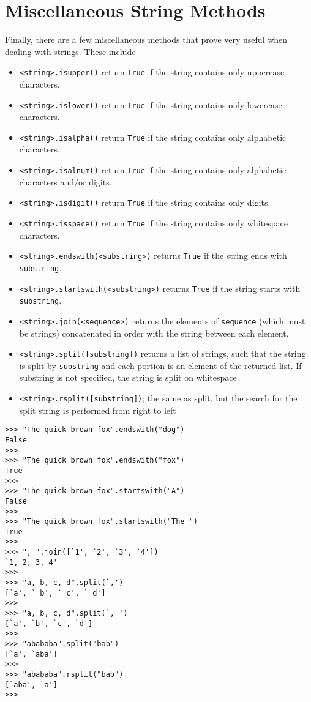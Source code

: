 \section{Miscellaneous String Methods}

Finally, there are a few miscellaneous methods that prove very   useful when dealing with strings. These include
\begin{itemize}
	\item 
\texttt{<string>.isupper()} return \texttt{True} if the string    contains only uppercase characters.
	\item 
\texttt{<string>.islower()} return \texttt{True} if the string    contains only lowercase characters.
	\item 
\texttt{<string>.isalpha()} return \texttt{True} if the string    contains only alphabetic characters.
	\item 
\texttt{<string>.isalnum()} return \texttt{True} if the string    contains only alphabetic characters and/or digits.
	\item 
\texttt{<string>.isdigit()} return \texttt{True} if the string    contains only digits.
	\item 
\texttt{<string>.isspace()} return \texttt{True} if the string    contains only whitespace characters.
	\item 
\texttt{<string>.endswith(<substring>)} returns    \texttt{True} if the string ends with \texttt{substring}.
	\item 
\texttt{<string>.startswith(<substring>)}    returns \texttt{True} if the string starts with \texttt{substring}.
	\item 
\texttt{<string>.join(<sequence>)} returns the    elements of \texttt{sequence} (which must be strings) concatenated in    order with the string between each element.
	\item 
\texttt{<string>.split([substring])} returns a list    of strings, such that the string is split by \texttt{substring} and each    portion is an element of the returned list. If substring is not    specified, the string is split on whitespace.
	\item 
\texttt{<string>.rsplit([substring])}; the same as    split, but the search for the split string is performed from right    to left
\end{itemize}
\begin{lstlisting}
>>> "The quick brown fox".endswith("dog")
False
>>>
>>> "The quick brown fox".endswith("fox")
True
>>>
>>> "The quick brown fox".startswith("A")
False
>>>
>>> "The quick brown fox".startswith("The ")
True
>>>
>>> ", ".join([`1', `2', `3', `4'])
`1, 2, 3, 4'
>>> 
>>> "a, b, c, d".split(`,')
[`a', ` b', ` c', ` d']
>>>
>>> "a, b, c, d".split(`, ')
[`a', `b', `c', `d']
>>> 
>>> "abababa".split("bab")
[`a', `aba']
>>>
>>> "abababa".rsplit("bab")
[`aba', `a']
>>>
\end{lstlisting}

